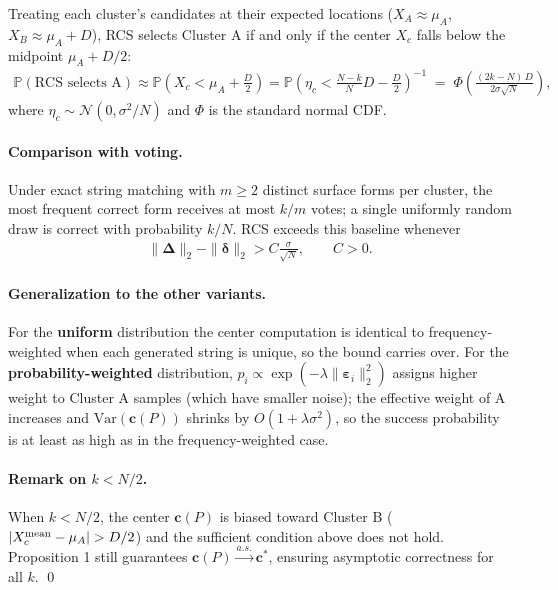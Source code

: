 Treating each cluster's candidates at their expected locations (\(X_A \approx \mu_A\), \(X_B \approx \mu_A + D\)), RCS selects Cluster A if and only if the center \(X_c\) falls below the midpoint \(\mu_A + D/2\):
\begin{align}
    \mathbb{P}(\text{RCS selects A})
    \approx \mathbb{P}\!\left(X_c < \mu_A + \tfrac{D}{2}\right)
    = \mathbb{P}\!\left(\eta_c < \tfrac{N-k}{N}D - \tfrac{D}{2}\right)^{-1}
    \;=\; \Phi\!\left(\frac{(2k-N)\,D}{2\sigma\sqrt{N}}\right),
\end{align}
where \(\eta_c \sim \mathcal{N}(0, \sigma^2/N)\) and \(\Phi\) is the standard normal CDF.

\paragraph{Comparison with voting.} Under exact string matching with \(m \geq 2\) distinct surface forms per cluster, the most frequent correct form receives at most \(k/m\) votes; a single uniformly random draw is correct with probability \(k/N\). RCS exceeds this baseline whenever
\begin{align}
    \|\boldsymbol{\Delta}\|_2 - \|\boldsymbol{\delta}\|_2 > C\frac{\sigma}{\sqrt{N}}, \qquad C > 0.
\end{align}

\paragraph{Generalization to the other variants.} For the \textbf{uniform} distribution the center computation is identical to frequency-weighted when each generated string is unique, so the bound carries over. For the \textbf{probability-weighted} distribution, \(p_i \propto \exp(-\lambda\|\boldsymbol{\varepsilon}_i\|_2^2)\) assigns higher weight to Cluster A samples (which have smaller noise); the effective weight of A increases and \(\mathrm{Var}(\mathbf{c}(P))\) shrinks by \(O(1+\lambda\sigma^2)\), so the success probability is at least as high as in the frequency-weighted case.

\paragraph{Remark on \(k < N/2\).} When \(k < N/2\), the center \(\mathbf{c}(P)\) is biased toward Cluster B (\(|X_c^{\rm mean} - \mu_A| > D/2\)) and the sufficient condition above does not hold. Proposition 1 still guarantees \(\mathbf{c}(P) \xrightarrow{a.s.} \mathbf{c}^*\), ensuring asymptotic correctness for all \(k\).
\qed

